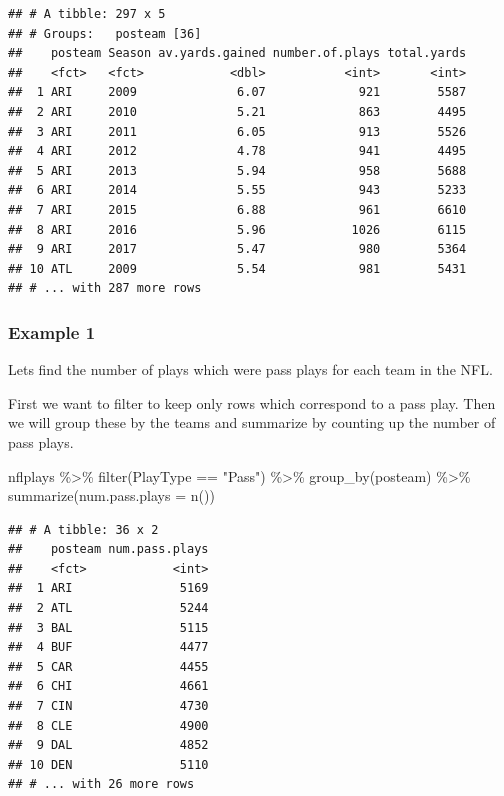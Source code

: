 \documentclass[
]{book}
\newenvironment{Shaded}{\begin{snugshade}}{\end{snugshade}}
\newcommand{\AttributeTok}[1]{\textcolor[rgb]{0.77,0.63,0.00}{#1}}
\newcommand{\FunctionTok}[1]{\textcolor[rgb]{0.00,0.00,0.00}{#1}}
\newcommand{\NormalTok}[1]{#1}
\newcommand{\SpecialCharTok}[1]{\textcolor[rgb]{0.00,0.00,0.00}{#1}}
\newcommand{\StringTok}[1]{\textcolor[rgb]{0.31,0.60,0.02}{#1}}
\theoremstyle{definition}
\theoremstyle{definition}
\theoremstyle{definition}
\theoremstyle{definition}
\theoremstyle{remark}
\begin{document}
\begin{verbatim}
## # A tibble: 297 x 5
## # Groups:   posteam [36]
##    posteam Season av.yards.gained number.of.plays total.yards
##    <fct>   <fct>            <dbl>           <int>       <int>
##  1 ARI     2009              6.07             921        5587
##  2 ARI     2010              5.21             863        4495
##  3 ARI     2011              6.05             913        5526
##  4 ARI     2012              4.78             941        4495
##  5 ARI     2013              5.94             958        5688
##  6 ARI     2014              5.55             943        5233
##  7 ARI     2015              6.88             961        6610
##  8 ARI     2016              5.96            1026        6115
##  9 ARI     2017              5.47             980        5364
## 10 ATL     2009              5.54             981        5431
## # ... with 287 more rows
\end{verbatim}

\hypertarget{example-1}{%
\subsubsection{Example 1}\label{example-1}}

Lets find the number of plays which were pass plays for each team in the NFL.

First we want to filter to keep only rows which correspond to a pass play. Then we will group these by the teams and summarize by counting up the number of pass plays.

\begin{Shaded}
\begin{Highlighting}[]
\NormalTok{nflplays }\SpecialCharTok{\%\textgreater{}\%}
    \FunctionTok{filter}\NormalTok{(PlayType }\SpecialCharTok{==} \StringTok{"Pass"}\NormalTok{) }\SpecialCharTok{\%\textgreater{}\%}
    \FunctionTok{group\_by}\NormalTok{(posteam) }\SpecialCharTok{\%\textgreater{}\%}
    \FunctionTok{summarize}\NormalTok{(}\AttributeTok{num.pass.plays =} \FunctionTok{n}\NormalTok{())}
\end{Highlighting}
\end{Shaded}

\begin{verbatim}
## # A tibble: 36 x 2
##    posteam num.pass.plays
##    <fct>            <int>
##  1 ARI               5169
##  2 ATL               5244
##  3 BAL               5115
##  4 BUF               4477
##  5 CAR               4455
##  6 CHI               4661
##  7 CIN               4730
##  8 CLE               4900
##  9 DAL               4852
## 10 DEN               5110
## # ... with 26 more rows
\end{verbatim}
\end{document}
